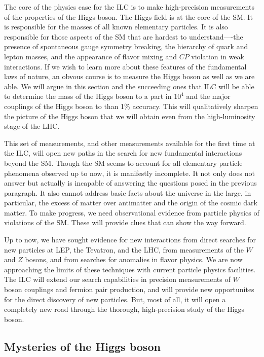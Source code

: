 

The core of the physics case for the ILC is to make high-precision
 measurements of the properties of the Higgs boson.    The Higgs
 field is at the core of
 the SM.  It is responsible for the masses of all known
 elementary particles.
  It is also responsible for those aspects of the SM that are
 hardest to  understand----the
presence of spontaneous gauge symmetry breaking, the  hierarchy of quark and lepton masses, and the appearance of flavor mixing and $CP$ violation in weak 
interactions.
If we wish to learn more about these features of the fundamental laws of nature, an obvous course is to measure the Higgs boson as well as we are able.  We will argue in this section and the succeeding ones that ILC will be able to determine the mass of the Higgs boson to a part in $10^4$ and the major couplings of the Higgs boson to than 1\% accuracy.   This will qualitatively sharpen the picture of the Higgs boson that we will obtain even from the high-luminosity stage of the LHC. 

This set of measurements, and other measurements available for the first time at the ILC, will open new paths in the search for new fundamental interactions beyond the SM. 
Though the SM seems to account for all elementary particle phenomena observed up to now, it is manifestly incomplete.   It not only does not answer but actually is incapable of answering the questions posed in the previous paragraph.  It also cannot address basic facts about the universe in the large, in particular, the excess of matter over antimatter and the origin of the cosmic dark matter.  To make progress, we need observational evidence from particle physics of violations of the SM.  These will provide clues that can show the way forward.

Up to now, we have sought evidence for new interactions from direct searches for new particles at LEP, the Tevatron, and the LHC, from measurements of the $W$ and $Z$ bosons, and from searches for anomalies in flavor physics.  We are now approaching the limits of these techniques with current particle physics facilities.  The ILC will 
extend our search capabilities in precision measurements of $W$ boson couplings and fermion pair production, and will provide new opportunites for the direct discovery of new particles.  But, most of all, it will open a completely new road through the thorough, high-precision study of the Higgs boson. 


\subsection{Mysteries of the Higgs boson}

